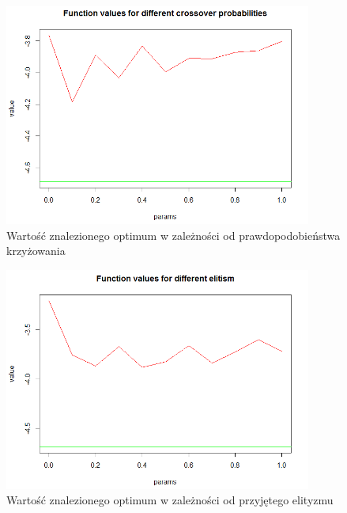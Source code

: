 \documentclass[11pt, a4paper]{article}
\begin{document}
\begin{figure}[H]
	\begin{center}
		\includegraphics[width=0.9\textwidth]{./assets/EMichalewicz3.png} %
		\caption{Wartość znalezionego optimum w zależności od prawdopodobieństwa krzyżowania}
		\label{fig:emichalewicz3}
	\end{center}
\end{figure}

\begin{figure}[H]
	\begin{center}
		\includegraphics[width=0.9\textwidth]{./assets/EMichalewicz4.png} %
		\caption{Wartość znalezionego optimum w zależności od przyjętego elityzmu}
		\label{fig:emichalewicz4}
	\end{center}
\end{figure}
\end{document}
